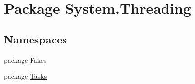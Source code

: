 \hypertarget{namespace_system_1_1_threading}{\section{Package System.\-Threading}
\label{namespace_system_1_1_threading}
}
\subsection*{Namespaces}
\begin{DoxyCompactItemize}
\item 
package \hyperlink{namespace_system_1_1_threading_1_1_fakes}{Fakes}
\item 
package \hyperlink{namespace_system_1_1_threading_1_1_tasks}{Tasks}
\end{DoxyCompactItemize}
